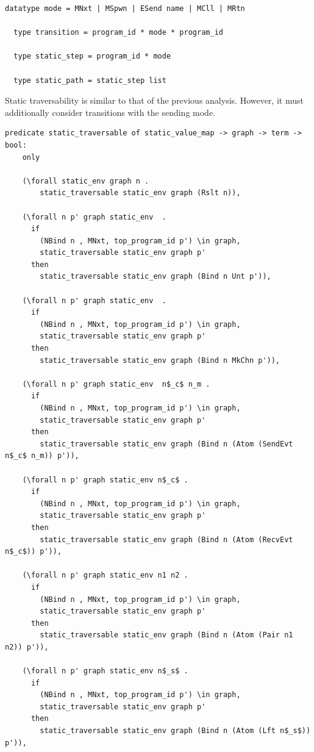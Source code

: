 \documentclass[10pt]{article}
\begin{document}
\begin{lstlisting}[language=logic, mathescape]
  datatype mode = MNxt | MSpwn | ESend name | MCll | MRtn

  type transition = program_id * mode * program_id

  type static_step = program_id * mode

  type static_path = static_step list
\end{lstlisting}

Static traversability is similar to that of the previous analysis.
However, it must additionally consider transitions with the sending mode. 

\begin{lstlisting}[language=logic, mathescape]
  predicate static_traversable of static_value_map -> graph -> term -> bool:
    only
    
    (\forall static_env graph n .
        static_traversable static_env graph (Rslt n)),

    (\forall n p' graph static_env  .
      if
        (NBind n , MNxt, top_program_id p') \in graph,
        static_traversable static_env graph p'
      then
        static_traversable static_env graph (Bind n Unt p')),

    (\forall n p' graph static_env  .
      if
        (NBind n , MNxt, top_program_id p') \in graph,
        static_traversable static_env graph p'
      then
        static_traversable static_env graph (Bind n MkChn p')),

    (\forall n p' graph static_env  n$_c$ n_m .
      if
        (NBind n , MNxt, top_program_id p') \in graph,
        static_traversable static_env graph p'
      then
        static_traversable static_env graph (Bind n (Atom (SendEvt n$_c$ n_m)) p')),

    (\forall n p' graph static_env n$_c$ .
      if
        (NBind n , MNxt, top_program_id p') \in graph,
        static_traversable static_env graph p'
      then
        static_traversable static_env graph (Bind n (Atom (RecvEvt n$_c$)) p')),

    (\forall n p' graph static_env n1 n2 .
      if
        (NBind n , MNxt, top_program_id p') \in graph,
        static_traversable static_env graph p'
      then
        static_traversable static_env graph (Bind n (Atom (Pair n1 n2)) p')),

    (\forall n p' graph static_env n$_s$ .
      if
        (NBind n , MNxt, top_program_id p') \in graph,
        static_traversable static_env graph p'
      then
        static_traversable static_env graph (Bind n (Atom (Lft n$_s$)) p')),


\end{lstlisting}
\end{document}
